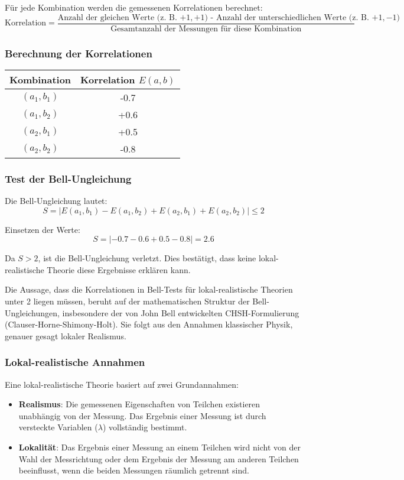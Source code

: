 \documentclass[12pt,a4paper]{article}
\begin{document}
	Für jede Kombination werden die gemessenen Korrelationen berechnet:
	\[
	\text{Korrelation} = \frac{\text{Anzahl der gleichen Werte (z. B. \(+1, +1\)) - Anzahl der unterschiedlichen Werte (z. B. \(+1, -1\))}}{\text{Gesamtanzahl der Messungen für diese Kombination}}
	\]
	
	
	\subsubsection{Berechnung der Korrelationen}
	\begin{tabular}{|c|c|}
		\hline
		Kombination & Korrelation \(E(a,b)\) \\
		\hline
		\((a_1, b_1)\) & -0.7 \\
		\((a_1, b_2)\) & +0.6 \\
		\((a_2, b_1)\) & +0.5 \\
		\((a_2, b_2)\) & -0.8 \\
		\hline
	\end{tabular}
	
	\subsubsection{Test der Bell-Ungleichung}
	Die Bell-Ungleichung lautet:
	\[
	S = |E(a_1, b_1) - E(a_1, b_2) + E(a_2, b_1) + E(a_2, b_2)| \leq 2
	\]
	
	Einsetzen der Werte:
	\[
	S = |-0.7 - 0.6 + 0.5 - 0.8| = 2.6
	\]
	
	Da \(S > 2\), ist die Bell-Ungleichung verletzt. Dies bestätigt, dass keine lokal-realistische Theorie diese Ergebnisse erklären kann.
	
	Die Aussage, dass die Korrelationen in Bell-Tests für lokal-realistische Theorien unter 2 liegen müssen, beruht auf der mathematischen Struktur der Bell-Ungleichungen, insbesondere der von John Bell entwickelten CHSH-Formulierung (Clauser-Horne-Shimony-Holt). Sie folgt aus den Annahmen klassischer Physik, genauer gesagt lokaler Realismus.
	
	
	\subsubsection{Lokal-realistische Annahmen}
	Eine lokal-realistische Theorie basiert auf zwei Grundannahmen:
	\begin{itemize}
		\item \textbf{Realismus}: Die gemessenen Eigenschaften von Teilchen existieren unabhängig von der Messung. Das Ergebnis einer Messung ist durch versteckte Variablen (\(\lambda\)) vollständig bestimmt.
		\item \textbf{Lokalität}: Das Ergebnis einer Messung an einem Teilchen wird nicht von der Wahl der Messrichtung oder dem Ergebnis der Messung am anderen Teilchen beeinflusst, wenn die beiden Messungen räumlich getrennt sind.
	\end{itemize}
	
\end{document}
